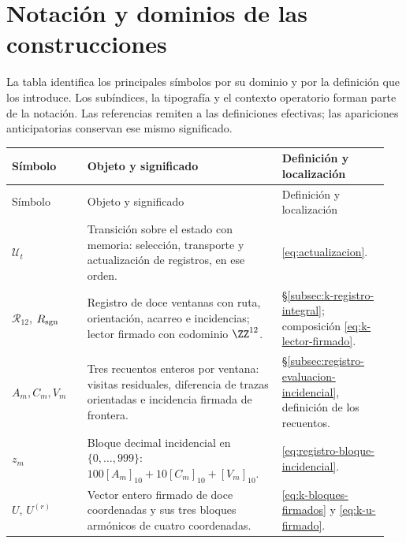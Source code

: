 \section*{Notación y dominios de las construcciones}
\label{sec:ii-notacion}

La tabla identifica los principales símbolos por su dominio y por la
definición que los introduce. Los subíndices, la tipografía y el contexto
operatorio forman parte de la notación. Las referencias remiten a las
definiciones efectivas; las apariciones anticipatorias conservan ese
mismo significado.

\begingroup
\small
\setlength{\tabcolsep}{4pt}
\renewcommand{\arraystretch}{1.12}
\begin{longtable}{@{}>{\raggedright\arraybackslash}p{0.19\linewidth}
                    >{\raggedright\arraybackslash}p{0.49\linewidth}
                    >{\raggedright\arraybackslash}p{0.27\linewidth}@{}}
\toprule
Símbolo & Objeto y significado & Definición y localización\\
\midrule
\endfirsthead
\toprule
Símbolo & Objeto y significado & Definición y localización\\
\midrule
\endhead
\bottomrule
\endfoot

\(\mathcal U_t\)
& Transición sobre el estado con memoria: selección, transporte y
  actualización de registros, en ese orden.
& \eqref{eq:actualizacion}.\\[3pt]

\(\mathcal R_{12}\), \(R_{\rm sgn}\)
& Registro de doce ventanas con ruta, orientación, acarreo e incidencias;
  lector firmado con codominio \(\ZZ^{12}\).
& \S\ref{subsec:k-registro-integral};
  composición \eqref{eq:k-lector-firmado}.\\[3pt]

\(A_m,C_m,V_m\)
& Tres recuentos enteros por ventana: visitas residuales, diferencia de
  trazas orientadas e incidencia firmada de frontera.
& \S\ref{subsec:registro-evaluacion-incidencial},
  definición de los recuentos.\\[3pt]

\(z_m\)
& Bloque decimal incidencial en \(\{0,\ldots,999\}\):
  \(100[A_m]_{10}+10[C_m]_{10}+[V_m]_{10}\).
& \eqref{eq:registro-bloque-incidencial}.\\[3pt]

\(U\), \(U^{(r)}\)
& Vector entero firmado de doce coordenadas y sus tres bloques
  armónicos de cuatro coordenadas.
& \eqref{eq:k-bloques-firmados} y
  \eqref{eq:k-u-firmado}.\\[3pt]


\end{longtable}
